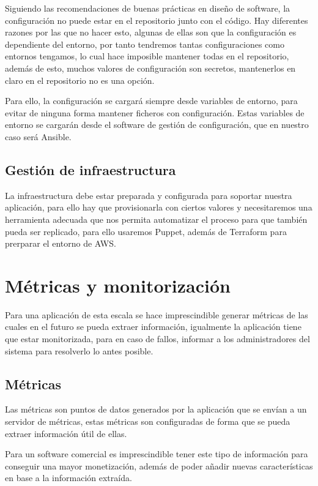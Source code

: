 \documentclass[12pt,a4paperpaper,]{report}
\begin{document}
Siguiendo las recomendaciones de buenas prácticas en diseño de software,
la configuración no puede estar en el repositorio junto con el código.
Hay diferentes razones por las que no hacer esto, algunas de ellas son
que la configuración es dependiente del entorno, por tanto tendremos
tantas configuraciones como entornos tengamos, lo cual hace imposible
mantener todas en el repositorio, además de esto, muchos valores de
configuración son secretos, mantenerlos en claro en el repositorio no es
una opción.

Para ello, la configuración se cargará siempre desde variables de
entorno, para evitar de ninguna forma mantener ficheros con
configuración. Estas variables de entorno se cargarán desde el software
de gestión de configuración, que en nuestro caso será Ansible.

\subsection{Gestión de
infraestructura}\label{gestiuxf3n-de-infraestructura}

La infraestructura debe estar preparada y configurada para soportar
nuestra aplicación, para ello hay que provisionarla con ciertos valores
y necesitaremos una herramienta adecuada que nos permita automatizar el
proceso para que también pueda ser replicado, para ello usaremos Puppet,
además de Terraform para prerparar el entorno de AWS.

\section{Métricas y
monitorización}\label{muxe9tricas-y-monitorizaciuxf3n}

Para una aplicación de esta escala se hace imprescindible generar
métricas de las cuales en el futuro se pueda extraer información,
igualmente la aplicación tiene que estar monitorizada, para en caso de
fallos, informar a los administradores del sistema para resolverlo lo
antes posible.

\subsection{Métricas}\label{muxe9tricas}

Las métricas son puntos de datos generados por la aplicación que se
envían a un servidor de métricas, estas métricas son configuradas de
forma que se pueda extraer información útil de ellas.

Para un software comercial es imprescindible tener este tipo de
información para conseguir una mayor monetización, además de poder
añadir nuevas características en base a la información extraída.
\end{document}
